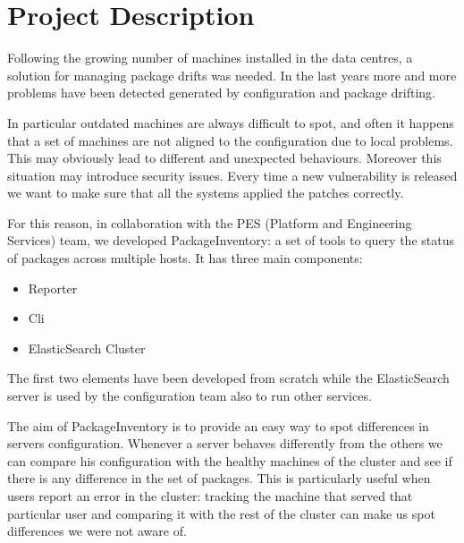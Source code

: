 \section{Project Description}

Following the growing number of machines installed in the data centres,
a solution for managing package drifts was needed. In the last years more
and more problems have been detected generated by configuration and
package drifting.

In particular outdated machines are always difficult to spot, and often it
happens that a set of machines are not aligned to the configuration due to
local problems. This may obviously lead to different and unexpected
behaviours. Moreover this situation may introduce security issues. Every
time a new vulnerability is released we want to make sure that all the
systems applied the patches correctly.

For this reason, in collaboration with the PES (Platform and Engineering
Services) team, we developed PackageInventory: a set of tools to query the
status of packages across multiple hosts. It has three main components:

\begin{itemize}
  \item Reporter
  \item Cli
  \item ElasticSearch Cluster
\end{itemize}

The first two elements have been developed from scratch while the
ElasticSearch server is used by the configuration team also to run other
services.

The aim of PackageInventory is to provide an easy way to spot differences
in servers configuration. Whenever a server behaves differently from the
others we can compare his configuration with the healthy machines of the
cluster and see if there is any difference in the set of packages. This is
particularly useful when users report an error in the cluster: tracking
the machine that served that particular user and comparing it with the
rest of the cluster can make us spot differences we were not aware of.
